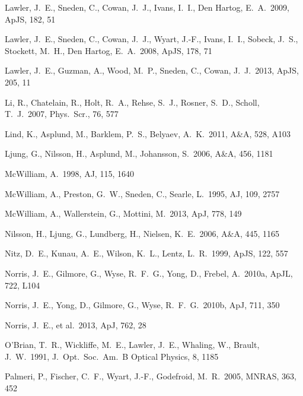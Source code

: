\documentclass[useAMS,usenatbib,usegraphicx]{mn2e}
\def\apj{ApJ}
\def\aap{A\&A}
\def\aj{AJ}
\def\mnras{MNRAS}
\def\apjs{ApJS}
\def\apjl{ApJL}
\def\physscr{Phys.\ Scr.}
\begin{document}
\begin{thebibliography}{}
 Lawler, J.~E., Sneden, 
C., Cowan, J.~J., Ivans, I.~I., Den Hartog, E.~A.\ 2009, \apjs, 182, 51 

 Lawler, J.~E., Sneden, 
C., Cowan, J.~J., Wyart, J.-F., Ivans, I.~I., Sobeck, J.~S., Stockett, 
M.~H., Den Hartog, E.~A.\ 2008, \apjs, 178, 71 

 Lawler, J.~E., Guzman, 
A., Wood, M.~P., Sneden, C., Cowan, J.~J.\ 2013, \apjs, 205, 11 

 Li, R., Chatelain, R., Holt, 
R.~A., Rehse, S.~J., Rosner, S.~D., Scholl, T.~J.\ 2007, \physscr, 76, 577 

 Lind, K., Asplund, M., Barklem, P.~S., 
Belyaev, A.~K.\ 2011, \aap, 528, A103

 Ljung, G., Nilsson, H., Asplund, M., 
Johansson, S.\ 2006, \aap, 456, 1181 

 McWilliam, A.\ 1998, \aj, 115, 1640 

 McWilliam, A., 
Preston, G.~W., Sneden, C., Searle, L.\ 1995, \aj, 109, 2757 

 McWilliam, A., 
Wallerstein, G., Mottini, M.\ 2013, \apj, 778, 149 

 Nilsson, H., Ljung, G., 
Lundberg, H., Nielsen, K.~E.\ 2006, \aap, 445, 1165 

 Nitz, D.~E., Kunau, A.~E., 
Wilson, K.~L., Lentz, L.~R.\ 1999, \apjs, 122, 557 

 Norris, J.~E., Gilmore, 
G., Wyse, R.~F.~G., Yong, D., Frebel, A.\ 2010a, \apjl, 722, L104 

 Norris, J.~E., Yong, D., 
Gilmore, G., Wyse, R.~F.~G.\ 2010b, \apj, 711, 350 

 Norris, J.~E., 
et al.\ 2013, \apj, 762, 28 

 O'Brian, T.~R., Wickliffe, M.~E., 
Lawler, J.~E., Whaling, W., Brault, J.~W.\ 1991, J.\ Opt.\ Soc.\ Am.\ B 
Optical Physics, 8, 1185 

 Palmeri, P., Fischer, 
C.~F., Wyart, J.-F., Godefroid, M.~R.\ 2005, \mnras, 363, 452 


\end{thebibliography}
\end{document}
